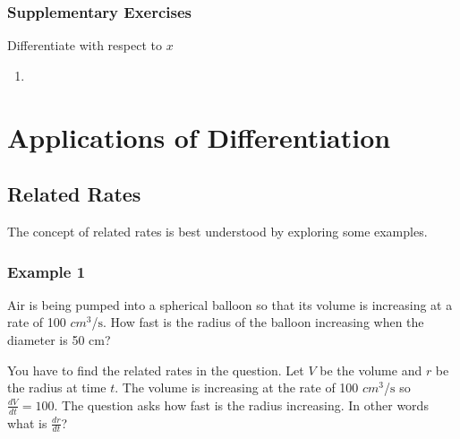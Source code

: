 \subsubsection{Supplementary Exercises}
Differentiate with respect to $x$ 


\begin{enumerate}
\item   
\columnsep =30pt
  \end{enumerate}


\section{Applications of Differentiation}


\subsection{Related Rates}
The concept of related rates is best understood by exploring some examples. 

\subsubsection{Example 1}
Air is being pumped into a spherical balloon so that its volume is increasing at a rate of 100 $cm^{3}$/$\mbox{s}$. How fast is the radius of
the balloon increasing when the diameter is 50 $\mbox{cm}$? 

You have to find the related rates in the question. Let
$V$ be the volume and $r$ be the radius at time $t$. The volume is increasing at the rate of 100 $cm^{3}$/$\mbox{s}$ so $\frac{d V}{d t} =100$. The question asks how fast is the radius increasing. In
other words what is $\frac{d r}{d t}$? 

